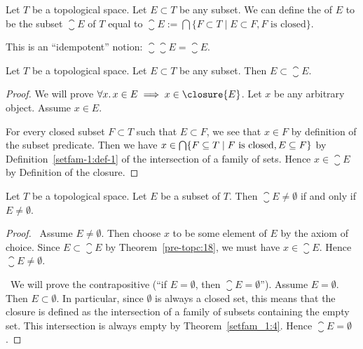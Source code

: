 \begin{definition}
Let $T$ be a topological space. Let $E\subset T$ be any subset.
We can define the  of $E$ to be the subset
$\closure{E}$ of $T$
equal to $\closure{E}:=\bigcap\{F\subset T\mid E\subset F, F\mbox{ is closed}\}$.

This is an ``idempotent'' notion: $\closure{\closure{E}}=\closure{E}$.
\end{definition}

\begin{theorem}\label{pre-topc:18}
Let $T$ be a topological space. Let $E\subset T$ be any subset.
Then $E\subset\closure{E}$.
\end{theorem}

\begin{proof}
We will prove $\forall x\ldotp x\in E\implies x\in\closure{E}$.
Let $x$ be any arbitrary object. Assume $x\in E$.

For every closed subset $F\subset T$ such that $E\subset F$, we see
that $x\in F$ by definition of the subset predicate. Then we have
$x\in\Intersects\{F\subset T\mid F\mbox{ is closed}, E\subset F\}$ by
Definition~\ref{setfam-1:def-1} of the intersection of a family of sets. Hence
$x\in\closure{E}$ by Definition of the closure.
\end{proof}

\begin{theorem}
Let $T$ be a topological space. Let $E$ be a subset of $T$.
Then $\closure{E}\neq\emptyset$ if and only if $E\neq\emptyset$.
\end{theorem}

\begin{proof}
\backwardproof\ Assume $E\neq\emptyset$. Then choose $x$ to be some
element of $E$ by the axiom of choice. Since $E\subset\closure{E}$ by Theorem~\ref{pre-topc:18},
we must have $x\in\closure{E}$. Hence $\closure{E}\neq\emptyset$.

\forwardproof\ We will prove the contrapositive (``if $E=\emptyset$,
then $\closure{E}=\emptyset$''). Assume $E=\emptyset$. Then
$E\subset\emptyset$. In particular, since $\emptyset$ is always a
closed set, this means that the closure is defined as the intersection
of a family of subsets containing the empty set. This intersection is
always empty by Theorem~\ref{setfam_1:4}. Hence $\closure{E}=\emptyset$.
\end{proof}

